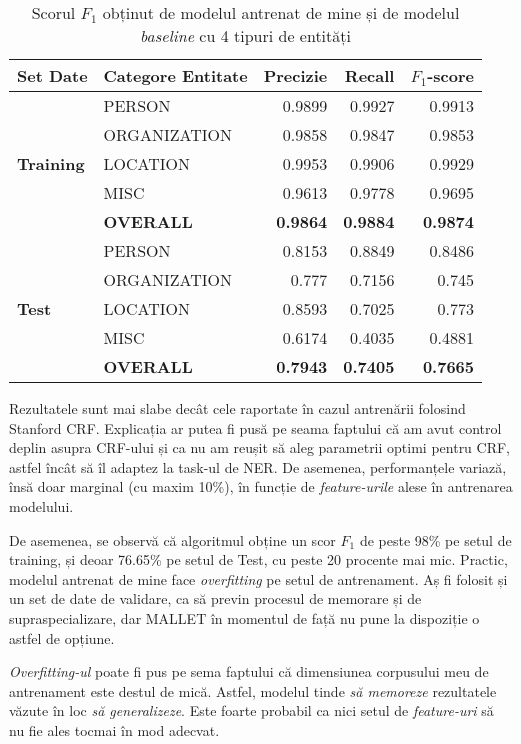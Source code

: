 \begin{center}
\begin{table}[htb]
  \caption{Scorul $F_1$ obținut de modelul antrenat de mine și de modelul \textit{baseline} cu 4 tipuri de entități}
  \begin{tabular}{|l|l|r|r|r|}
  \hline  
  Set Date & Categore Entitate & Precizie & Recall & $F_1$-score \\
  \hline  
  \multirow{5}{*}{\textbf{Training}} & PERSON & 0.9899 & 0.9927 & 0.9913 \\
  & ORGANIZATION & 0.9858 & 0.9847 & 0.9853 \\
  & LOCATION & 0.9953 & 0.9906 & 0.9929 \\
  & MISC & 0.9613 & 0.9778  & 0.9695 \\
   \hline 
  & \textbf{OVERALL} &\textbf{0.9864} & \textbf{0.9884} & \textbf{0.9874 }\\
  \hline  
  
  \multirow{5}{*}{\textbf{Test}} & PERSON & 0.8153 & 0.8849 & 0.8486 \\
    & ORGANIZATION & 0.777 & 0.7156 & 0.745 \\
    & LOCATION & 0.8593 & 0.7025 & 0.773 \\
    & MISC & 0.6174 & 0.4035  & 0.4881 \\
     \hline 
    & \textbf{OVERALL} & \textbf{0.7943} & \textbf{0.7405} & \textbf{0.7665} \\
    \hline  
  \end{tabular}
  \label{table:f1-score-mallet}
\end{table}
\end{center}

Rezultatele sunt mai slabe decât cele raportate în cazul antrenării folosind Stanford CRF. Explicația ar putea fi pusă pe seama faptului că am avut control deplin asupra CRF-ului și ca nu am reușit să aleg parametrii optimi pentru CRF, astfel încât să îl adaptez la task-ul de NER. De asemenea, performanțele variază, însă doar marginal (cu maxim 10\%), în funcție de \textit{feature-urile} alese în antrenarea modelului.

De asemenea, se observă că algoritmul obține un scor $F_1$ de peste 98\% pe setul de training, și deoar 76.65\% pe setul de Test, cu peste 20 procente mai mic. Practic, modelul antrenat de mine face \textit{overfitting} pe setul de antrenament. Aș fi folosit și un set de date de validare, ca să previn procesul de memorare și de supraspecializare, dar MALLET în momentul de față nu pune la dispoziție o astfel de opțiune.

\textit{Overfitting-ul} poate fi pus pe sema faptului că dimensiunea corpusului meu de antrenament este destul de mică. Astfel, modelul tinde \textit{să memoreze} rezultatele văzute în loc \textit{să generalizeze}. Este foarte probabil ca nici setul de \textit{feature-uri} să nu fie ales tocmai în mod adecvat.


















